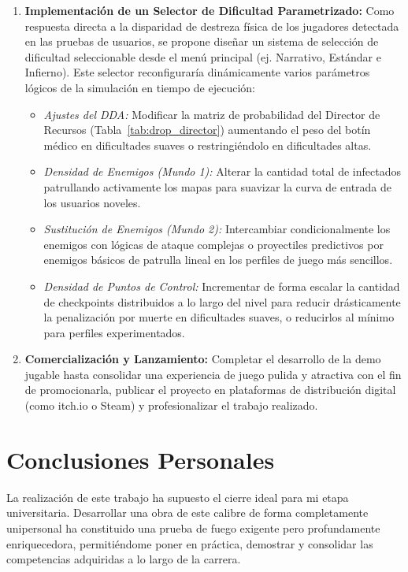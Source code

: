 \begin{enumerate}
    \item \textbf{Implementación de un Selector de Dificultad Parametrizado:} 
    Como respuesta directa a la disparidad de destreza física de los jugadores detectada en las pruebas de usuarios, se propone diseñar un sistema de selección de dificultad seleccionable desde el menú principal (ej. Narrativo, Estándar e Infierno). Este selector reconfiguraría dinámicamente varios parámetros lógicos de la simulación en tiempo de ejecución:
    \begin{itemize}
        \item \textit{Ajustes del DDA:} Modificar la matriz de probabilidad del Director de Recursos (Tabla~\ref{tab:drop_director}) aumentando el peso del botín médico en dificultades suaves o restringiéndolo en dificultades altas.
        \item \textit{Densidad de Enemigos (Mundo 1):} Alterar la cantidad total de infectados patrullando activamente los mapas para suavizar la curva de entrada de los usuarios noveles.
        \item \textit{Sustitución de Enemigos (Mundo 2):} Intercambiar condicionalmente los enemigos con lógicas de ataque complejas o proyectiles predictivos por enemigos básicos de patrulla lineal en los perfiles de juego más sencillos.
        \item \textit{Densidad de Puntos de Control:} Incrementar de forma escalar la cantidad de checkpoints distribuidos a lo largo del nivel para reducir drásticamente la penalización por muerte en dificultades suaves, o reducirlos al mínimo para perfiles experimentados.
    \end{itemize}
    
    \item \textbf{Comercialización y Lanzamiento:} Completar el desarrollo de la demo jugable hasta consolidar una experiencia de juego pulida y atractiva con el fin de promocionarla, publicar el proyecto en plataformas de distribución digital (como itch.io o Steam) y profesionalizar el trabajo realizado.
\end{enumerate}

\section{Conclusiones Personales}
\label{sec:conclusiones_personales}
La realización de este trabajo ha supuesto el cierre ideal para mi etapa universitaria. Desarrollar una obra de este calibre de forma completamente unipersonal ha constituido una prueba de fuego exigente pero profundamente enriquecedora, permitiéndome poner en práctica, demostrar y consolidar las competencias adquiridas a lo largo de la carrera.

